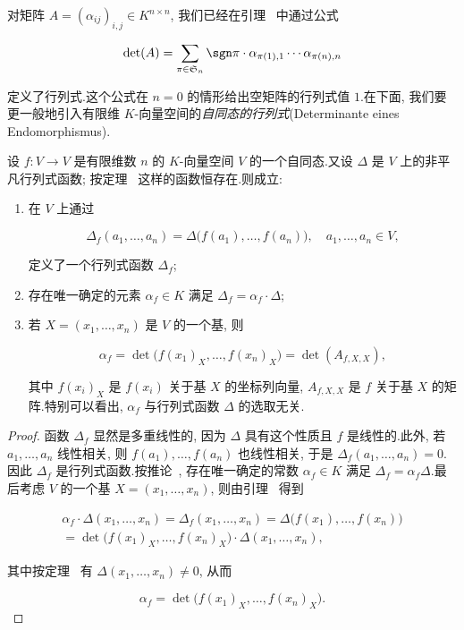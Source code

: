 对矩阵 $A = (\alpha_{ij})_{i, j} \in K^{n \times n}$, 我们已经在引理~ 中通过公式

\[
\det(A) = \sum_{\pi \in \mathfrak{S}_n} \sgn \pi \cdot \alpha_{\pi(1), 1} \cdots \alpha_{\pi(n), n}
\]

定义了行列式.这个公式在 $n = 0$ 的情形给出空矩阵的行列式值 $1$.在下面, 我们要更一般地引入有限维 $K$-向量空间的\emph{自同态的行列式}(\textup{Determinante eines Endomorphismus}).

\begin{remark}\label{rem:4.3.1}
设 $f \colon V \longrightarrow V$ 是有限维数 $n$ 的 $K$-向量空间 $V$ 的一个自同态.又设 $\varDelta$ 是 $V$ 上的非平凡行列式函数; 按定理~ 这样的函数恒存在.则成立:
\begin{enumerate}
\item[(i)] 在 $V$ 上通过

\[
\varDelta_f(a_1, \ldots, a_n) = \varDelta\big(f(a_1), \ldots, f(a_n)\big), \quad a_1, \ldots, a_n \in V,
\]

定义了一个行列式函数 $\varDelta_f$;
\item[(ii)] 存在唯一确定的元素 $\alpha_f \in K$ 满足 $\varDelta_f = \alpha_f \cdot \varDelta$;
\item[(iii)] 若 $X = (x_1, \ldots, x_n)$ 是 $V$ 的一个基, 则

\[
\alpha_f = \det\bigl(f(x_1)_X, \ldots, f(x_n)_X\bigr) = \det(A_{f, X, X}),
\]

其中 $f(x_i)_X$ 是 $f(x_i)$ 关于基 $X$ 的坐标列向量, $A_{f, X, X}$ 是 $f$ 关于基 $X$ 的矩阵.特别可以看出, $\alpha_f$ 与行列式函数 $\varDelta$ 的选取无关.
\end{enumerate}
\end{remark}

\begin{proof}
函数 $\varDelta_f$ 显然是多重线性的, 因为 $\varDelta$ 具有这个性质且 $f$ 是线性的.此外, 若 $a_1, \ldots, a_n$ 线性相关, 则 $f(a_1), \ldots, f(a_n)$ 也线性相关, 于是 $\varDelta_f(a_1, \ldots, a_n) = 0$.因此 $\varDelta_f$ 是行列式函数.按推论~, 存在唯一确定的常数 $\alpha_f \in K$ 满足 $\varDelta_f = \alpha_f \varDelta$.最后考虑 $V$ 的一个基 $X = (x_1, \ldots, x_n)$, 则由引理~ 得到

\[
\begin{array}{c}
\alpha_f \cdot \varDelta(x_1, \ldots, x_n) = \varDelta_f(x_1, \ldots, x_n) = \varDelta\big(f(x_1), \ldots, f(x_n)\big) \\
= \det\big(f(x_1)_X, \ldots, f(x_n)_X\big) \cdot \varDelta(x_1, \ldots, x_n),
\end{array}
\]

其中按定理~ 有 $\varDelta(x_1, \ldots, x_n) \neq 0$, 从而

\[
\alpha_f = \det\bigl(f(x_1)_X, \ldots, f(x_n)_X\bigr).
\]
\end{proof}

